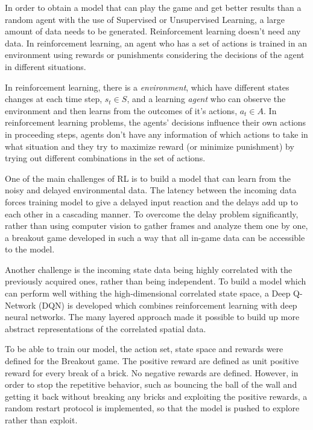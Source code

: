 In order to obtain a model that can play the game and get better results than a random agent with the use of Supervised or Unsupervised Learning, a large amount of data needs to be generated. Reinforcement learning doesn't need any
data. In reinforcement learning, an agent who has a set of actions is trained in an environment using rewards or punishments considering the decisions of the agent in different situations.

In reinforcement learning, there is a \emph{environment}, which have different states changes at each time step, \(s_t \in S\), and a learning \emph{agent} who can observe the environment and then learns from the outcomes of it's actions, \(a_t \in A\). In reinforcement learning problems, the agents' decisions influence their own actions in proceeding steps, agents don't have any information of which actions to take in what situation and they try to maximize reward (or minimize punishment) by trying out different combinations in the set of actions.

One of the main challenges of RL is to build a model that can learn from the noisy and delayed environmental data. The latency between the incoming data forces training model to give a delayed input reaction and the delays add up to each other in a cascading manner. To overcome the delay problem significantly, rather than using computer vision to gather frames and analyze them one by one, a breakout game developed in such a way that all in-game data can be accessible to the model.

Another challenge is the incoming state data being highly correlated with the previously acquired ones, rather than being independent. To build a model which can perform well withing the high-dimensional correlated state space, a Deep Q-Network (DQN) is developed which combines reinforcement learning with deep neural networks. The many layered approach made it possible to build up more abstract representations of the correlated spatial data.

To be able to train our model, the action set, state space and rewards were defined for the Breakout game. The positive reward are defined as unit positive reward for every break of a brick. No negative rewards are defined. However, in order to stop the repetitive behavior, such as bouncing the ball of the wall and getting it back without breaking any bricks and exploiting the positive rewards, a random restart protocol is implemented, so that the model is pushed to explore rather than exploit.